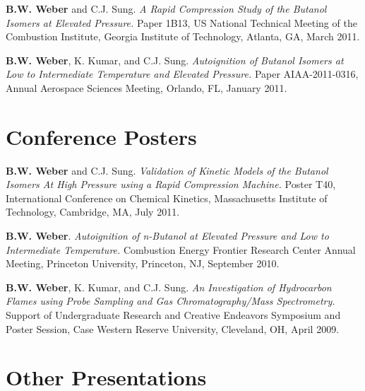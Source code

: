 \begin{bibsection}
\item[] \textbf{B.W. Weber} and C.J. Sung. \textit{A Rapid Compression
        Study of the Butanol Isomers at Elevated Pressure.} Paper 1B13,
          US National Technical Meeting of the Combustion
        Institute, Georgia Institute of Technology, Atlanta, GA, March
        2011.

\item[] \textbf{B.W. Weber}, K. Kumar, and C.J. Sung.
        \textit{Autoignition of Butanol Isomers at Low to Intermediate
        Temperature and Elevated Pressure.} Paper AIAA-2011-0316,
          Annual Aerospace Sciences Meeting,
        Orlando, FL, January 2011.
\end{bibsection}

\section{{\sectionfont Conference Posters}}

\begin{bibsection}
\item[] \textbf{B.W. Weber} and C.J. Sung. \textit{Validation of
        Kinetic Models of the Butanol Isomers At High Pressure
        using a Rapid Compression Machine.} Poster T40,
         International Conference on Chemical Kinetics,
         Massachusetts Institute of Technology, Cambridge, MA,
         July 2011.

\item[] \textbf{B.W. Weber}. \textit{Autoignition of n-Butanol at
        Elevated Pressure and Low to Intermediate Temperature.}
         Combustion Energy Frontier Research Center
        Annual Meeting, Princeton University, Princeton, NJ,
        September 2010.

\item[] \textbf{B.W. Weber}, K. Kumar, and C.J. Sung. \textit{An
        Investigation of Hydrocarbon Flames using Probe Sampling and
        Gas Chromatography/Mass Spectrometry.} Support of Undergraduate
        Research and Creative Endeavors Symposium and Poster Session,
        Case Western Reserve University, Cleveland, OH, April 2009.
\end{bibsection}

\section{{\sectionfont Other Presentations}}

